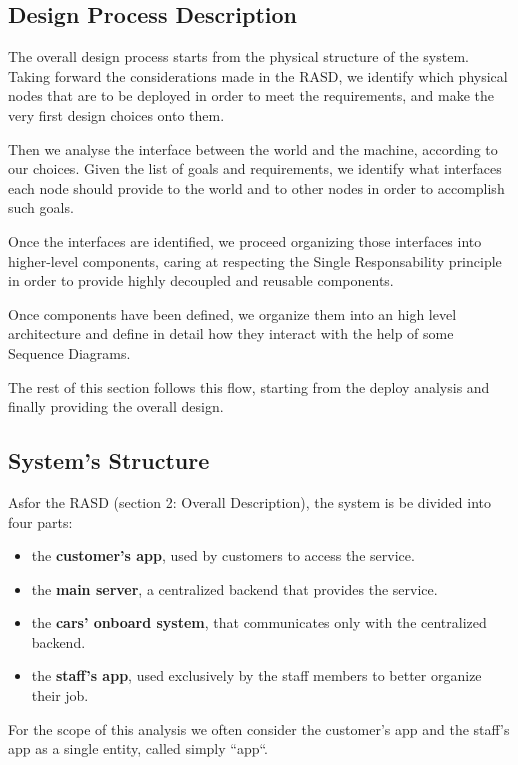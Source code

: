 \documentclass[11pt]{article} %
\begin{document}
\subsection{Design Process Description}

The overall design process starts from the physical structure of the system. Taking forward the considerations made in the RASD, we identify which physical nodes that are to be deployed in order to meet the requirements, and make the very first design choices onto them.

Then we analyse the interface between the world and the machine, according to our choices. Given the list of goals and requirements, we identify what interfaces each node should provide to the world and to other nodes in order to accomplish such goals.

Once the interfaces are identified, we proceed organizing those interfaces into higher-level components, caring at respecting the Single Responsability principle in order to provide highly decoupled and reusable components.

Once components have been defined, we organize them into an high level architecture and define in detail how they interact with the help of some Sequence Diagrams.

The rest of this section follows this flow, starting from the deploy analysis and finally providing the overall design.



\subsection{System's Structure}

Asfor the RASD (section 2: Overall Description), the system is be divided into four parts:
\begin{itemize}[noitemsep]
	\item the \textbf{customer's app}, used by customers to access the service.
	\item the \textbf{main server}, a centralized backend that provides the service.
	\item the \textbf{cars’ onboard system}, that communicates only with the centralized backend.
	\item the \textbf{staff's app}, used exclusively by the staff members to better organize their job.
\end{itemize}

For the scope of this analysis we often consider the customer's app and the staff's app as a single entity, called simply ``app``.
\end{document}
